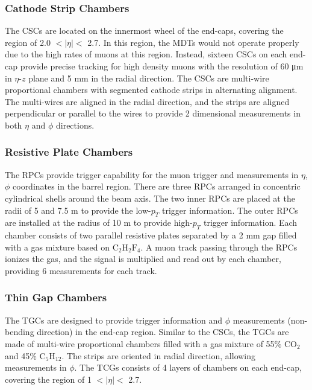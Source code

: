 \subsubsection{Cathode Strip Chambers}
\label{sec:atlas:csc}

The CSCs are located on the innermost wheel of the end-caps, covering the region of 2.0 $<|\eta|<$ 2.7. In this region, the MDTs would not operate properly due to the high rates of muons at this region. Instead, sixteen CSCs on each end-cap provide precise tracking for high density muons with the resolution of 60 \si{\micro\meter} in $\eta$-$z$ plane and 5 \si{\milli\meter} in the radial direction. The CSCs are multi-wire proportional chambers with segmented cathode strips in alternating alignment. The multi-wires are aligned in the radial direction, and the strips are aligned perpendicular or parallel to the wires to provide 2 dimensional measurements in both $\eta$ and $\phi$ directions.


\subsubsection{Resistive Plate Chambers}
\label{sec:atlas:rpc}

The RPCs provide trigger capability for the muon trigger and measurements in $\eta$, $\phi$ coordinates in the barrel region. There are three RPCs arranged in concentric cylindrical shells around the beam axis. The two inner RPCs are placed at the radii of 5 and 7.5 \si{\meter} to provide the low-$p_{T}$ trigger information. The outer RPCs are installed at the radius of 10 \si{\meter} to provide high-$p_{T}$ trigger information. Each chamber consists of two parallel resistive plates separated by a 2 \si{\milli\meter} gap filled with a gas mixture based on $\mathrm{C}_{2}\mathrm{H}_{2}\mathrm{F}_{4}$. A muon track passing through the RPCs ionizes the gas, and the signal is multiplied and read out by each chamber, providing 6 measurements for each track.

\subsubsection{Thin Gap Chambers}
\label{sec:atlas:tgc}

The TGCs are designed to provide trigger information and $\phi$ measurements (non-bending direction) in the end-cap region. Similar to the CSCs, the TGCs are made of multi-wire proportional chambers filled with a gas mixture of 55\% $\mathrm{CO}_{2}$ and 45\% $\mathrm{C}_{5}\mathrm{H}_{12}$. The strips are oriented in radial direction, allowing measurements in $\phi$. The TCGs consists of 4 layers of chambers on each end-cap, covering the region of 1 $<|\eta|<$ 2.7.


